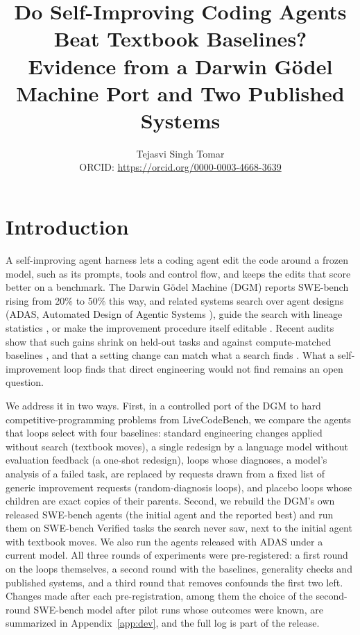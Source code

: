 \documentclass[11pt]{article}
\title{Do Self-Improving Coding Agents Beat Textbook Baselines?\\ Evidence from a Darwin G\"odel Machine Port and Two Published Systems}
\author{Tejasvi Singh Tomar\\[2pt]
\normalsize ORCID: \href{https://orcid.org/0000-0003-4668-3639}{https://orcid.org/0000-0003-4668-3639}}
\date{}
\begin{document}
\maketitle



\section{Introduction}
A self-improving agent harness lets a coding agent edit the code around a frozen model, such as its prompts, tools and
control flow, and keeps the edits that score better on a benchmark. The Darwin G\"odel Machine (DGM)
\citep{zhang2026dgm} reports SWE-bench rising from 20\% to 50\% this way, and related systems search over agent designs
(ADAS, Automated Design of Agentic Systems \citep{hu2025adas}), guide the search with lineage statistics \citep{wang2026hgm}, or make the improvement procedure
itself editable \citep{zhang2026hyperagents}. Recent audits show that such gains shrink on held-out tasks and against
compute-matched baselines \citep{hu2026winners,wang2026rethinking,ding2026hda,oved2026tokens}, and that a setting
change can match what a search finds \citep{xu2026harnessrepair}. What a self-improvement loop finds that direct
engineering would not find remains an open question.

We address it in two ways. First, in a controlled port of the DGM to hard competitive-programming problems from LiveCodeBench, we compare
the agents that loops select with four baselines: standard engineering changes applied without search (textbook
moves), a single redesign by a language model without evaluation feedback (a one-shot redesign), loops whose
diagnoses, a model's analysis of a failed task, are replaced by requests drawn from a fixed list of generic improvement
requests (random-diagnosis loops), and placebo loops whose children are exact copies of their parents. Second, we rebuild the DGM's own released SWE-bench agents (the initial agent and the reported best)
and run them on SWE-bench Verified tasks the search never saw, next to the initial agent with textbook moves. We
also run the agents released with ADAS under a current model. All three rounds of experiments were pre-registered: a first round on the loops themselves, a second round with the baselines, generality checks and published systems, and a third round that removes confounds the first two left. Changes made after each pre-registration,
among them the choice of the second-round SWE-bench model after pilot runs whose outcomes were known, are summarized in
Appendix~\ref{app:dev}, and the full log is part of the release.
\end{document}
